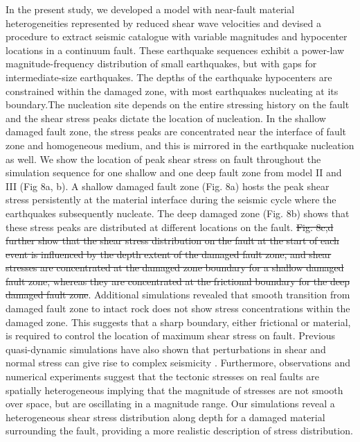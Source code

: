 \documentclass[11pt]{article}
\newcommand{\yihe}[1]{{\color{red}#1}}
\newcommand{\nathan}[1]{{\color{brown}#1}}
\begin{document}
In the present study, we developed a model with near-fault material heterogeneities represented by reduced shear wave velocities and devised a procedure to extract seismic catalogue with variable magnitudes and hypocenter locations in a continuum fault. These earthquake sequences exhibit a power-law magnitude-frequency distribution of small earthquakes, but with gaps for intermediate-size earthquakes. The depths of the earthquake hypocenters are constrained within the damaged zone, with most earthquakes nucleating at its boundary.The nucleation site depends on the entire stressing history on the fault and the shear stress peaks dictate the location of nucleation. In the shallow damaged fault zone, the stress peaks are concentrated near the interface of fault zone and homogeneous medium, and this is mirrored in the earthquake nucleation as well. We show the location of peak shear stress on fault throughout the simulation sequence for one shallow and one deep fault zone from model II and III (Fig 8a, b). \nathan{A shallow damaged fault zone (Fig. 8a) hosts the peak shear stress persistently at the material interface during the seismic cycle where the earthquakes subsequently nucleate. The deep damaged zone (Fig. 8b) shows that these stress peaks are distributed at different locations on the fault.} \st{Fig. 8c,d further show that the shear stress distribution on the fault at the start of each event is influenced by the depth extent of the damaged fault zone, and shear stresses are concentrated at the damaged zone boundary for a shallow damaged fault zone, whereas they are concentrated at the frictional boundary for the deep damaged fault zone}. Additional simulations revealed that smooth transition from damaged fault zone to intact rock does not show stress concentrations within the damaged zone. This suggests that a sharp boundary, either frictional or material, is required to control the location of maximum shear stress on fault. Previous quasi-dynamic simulations have also shown that perturbations in shear and normal stress can give rise to complex seismicity \citep{benzion_2001, perfettini_2003}. Furthermore, observations and numerical experiments suggest that the tectonic stresses on real faults are spatially heterogeneous \citep{townend_zoback_2000, rivera_kanamori_2002} \yihe{implying that the magnitude of stresses are not smooth over space}, but are oscillating in a magnitude range. Our simulations reveal a heterogeneous shear stress distribution along depth for a damaged material surrounding the fault, providing a more realistic description of stress distribution.
\end{document}
